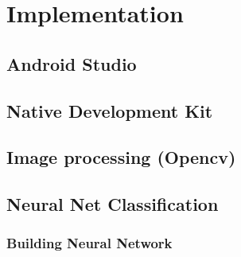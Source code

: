 
\chapter{Implementation}\label{chapter:Implementation}

\section{Android Studio }

\section{Native Development Kit}

\section{Image processing (Opencv)}

\section{Neural Net Classification}
\subsection{Building Neural Network}
